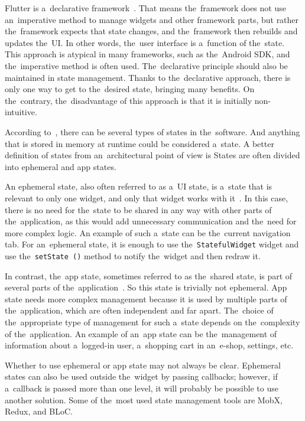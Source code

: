 Flutter is a~declarative framework~\cite{a2022_flutter_declarative}.
That means the~framework does not use an~imperative method to manage widgets and other framework parts, but rather the~framework expects that state changes, and the~framework then rebuilds and updates the~UI.
In other words, the~user interface is a~function of the~state.
This approach is atypical in many frameworks, such as the~Android SDK, and the~imperative method is often used.
The~declarative principle should also be maintained in state management.
Thanks to the~declarative approach, there is only one way to get to the~desired state, bringing many benefits.
On the~contrary, the~disadvantage of this approach is that it is initially non-intuitive.

According to~\cite{a2022_differentiate}, there can be several types of states in the~software.
And anything that is stored in memory at runtime could be considered a~state.
A better definition of states from an~architectural point of view is 
States are often divided into ephemeral and app states.

An ephemeral state, also often referred to as a~UI state, is a~state that is relevant to only one widget, and only that widget works with it~\cite{a2022_differentiate}.
In this case, there is no need for the~state to be shared in any way with other parts of the~application, as this would add unnecessary communication and the~need for more complex logic.
An example of such a~state can be the~current navigation tab.
For an~ephemeral state, it is enough to use the~\texttt {StatefulWidget} widget and use the~\texttt{setState ()} method to notify the~widget and then redraw it.

In contrast, the~app state, sometimes referred to as the~shared state, is part of several parts of the~application~\cite{a2022_differentiate}.
So this state is trivially not ephemeral.
App state needs more complex management because it is used by multiple parts of the~application, which are often independent and far apart.
The~choice of the~appropriate type of management for such a~state depends on the~complexity of the~application.
An example of an~app state can be the~management of information about a~logged-in user, a~shopping cart in an~e-shop, settings, etc.

Whether to use ephemeral or app state may not always be clear.
Ephemeral states can also be used outside the~widget by passing callbacks; however, if a~callback is passed more than one level, it will probably be possible to use another solution.
Some of the~most used state management tools are MobX, Redux, and BLoC.

